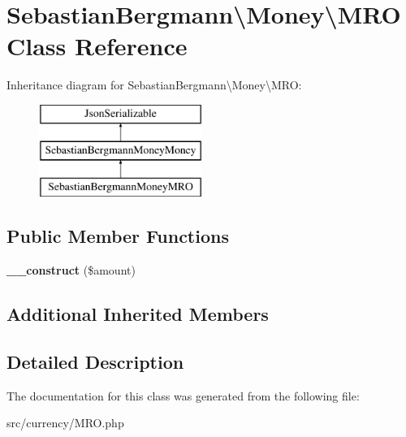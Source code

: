 \hypertarget{classSebastianBergmann_1_1Money_1_1MRO}{}\section{Sebastian\+Bergmann\textbackslash{}Money\textbackslash{}M\+R\+O Class Reference}
\label{classSebastianBergmann_1_1Money_1_1MRO}
Inheritance diagram for Sebastian\+Bergmann\textbackslash{}Money\textbackslash{}M\+R\+O\+:\begin{figure}[H]
\begin{center}
\leavevmode
\includegraphics[height=3.000000cm]{classSebastianBergmann_1_1Money_1_1MRO}
\end{center}
\end{figure}
\subsection*{Public Member Functions}
\begin{DoxyCompactItemize}
\item 
\hypertarget{classSebastianBergmann_1_1Money_1_1MRO_ae4df76dd7cac91ae5580fe2d560cc13b}{}{\bfseries \+\_\+\+\_\+construct} (\$amount)\label{classSebastianBergmann_1_1Money_1_1MRO_ae4df76dd7cac91ae5580fe2d560cc13b}

\end{DoxyCompactItemize}
\subsection*{Additional Inherited Members}


\subsection{Detailed Description}


The documentation for this class was generated from the following file\+:\begin{DoxyCompactItemize}
\item 
src/currency/M\+R\+O.\+php\end{DoxyCompactItemize}
